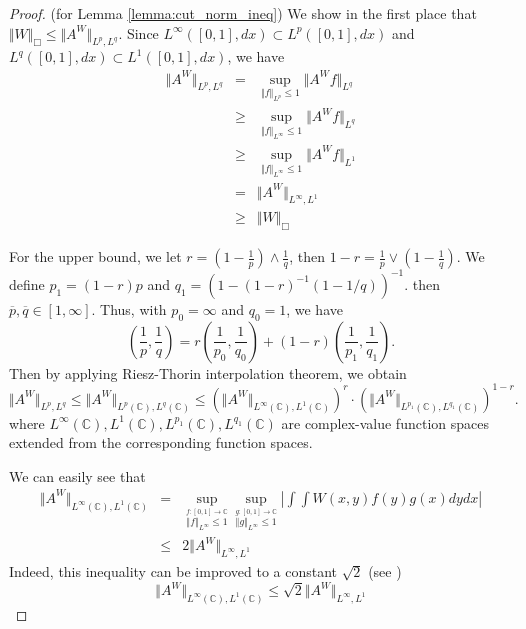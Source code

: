 \begin{proof}(for Lemma \ref{lemma:cut_norm_ineq})
We show in the first place that $\Vert W \Vert_{\Box} \leq \Vert A^W \Vert_{L^{p}, L^{q} }$. Since $L^{\infty}([0,1], dx) \subset L^p([0,1], dx)$ and $L^{q}([0,1], dx) \subset L^1([0,1],dx)$, we have
\begin{eqnarray*}
	\Vert A^W \Vert_{L^{p}, L^{q}} &=& \sup_{ \Vert f \Vert_{L^{p}} \leq 1 } \Vert A^W f \Vert_{L^{q} }\\
	&\geq & \sup_{ \Vert f \Vert_{L^\infty} \leq 1 } \Vert A^W f \Vert_{L^{q}} \\
	& \geq & \sup_{ \Vert f \Vert_{L^\infty} \leq 1 } \Vert A^W f \Vert_{L^1} \\
	&=& \Vert A^W \Vert_{L^{\infty}, L^1}\\
	&\geq& \Vert W \Vert_{\Box}
\end{eqnarray*}
	
For the upper bound, we let $r = (1-\frac{1}{p})\wedge \frac{1}{q}$, then $1-r = \frac{1}{p} \vee (1-\frac{1}{q})$. We define $p_1 =  (1-r)p$ and $q_1 = \left(1 - (1-r)^{-1} ( 1- 1/ q) \right)^{-1}$. then $\overline{p}, \overline{q} \in [1,\infty]$. Thus, with $p_0 = \infty$ and $q_0 = 1$, we have
$$
	\left( \frac{1}{p}, \frac{1}{q} \right) = r  \left(\frac{1}{p_0}, \frac{1}{q_0} \right) + (1-r) \left( \frac{1}{p_1}, \frac{1}{q_1} \right).
$$
Then by applying Riesz-Thorin interpolation theorem, we obtain
$$
	\Vert A^W \Vert_{L^{p}, L^{q} } \leq 	\Vert A^W \Vert_{L^{p}(\mathbb{C}), L^{q}(\mathbb{C}) } \leq \left( \Vert A^W \Vert_{L^{\infty}(\mathbb{C}), L^1(\mathbb{C})} \right)^r \cdot \left( \Vert A^W \Vert_{L^{p_1}(\mathbb{C}), L^{q_1}(\mathbb{C}) } \right)^{1-r}.
$$
where $L^{\infty}(\mathbb{C}), L^{1}(\mathbb{C}), L^{p_1}(\mathbb{C}), L^{q_1}(\mathbb{C})$ are complex-value function spaces extended from the corresponding function spaces.

We can easily see that
\begin{eqnarray*}
	\Vert A^W \Vert_{L^\infty(\mathbb{C}), L^1(\mathbb{C})} 
	&=& \sup_{\stackrel{ f: [0,1] \to \mathbb{C}}{\Vert f \Vert_{L^\infty} \leq 1} }  \sup_{\stackrel{ g: [0,1] \to \mathbb{C}}{\Vert g \Vert_{L^\infty} \leq 1} } \left\vert \int \int W(x,y) f(y) g(x) dy dx \right\vert \\
	&\leq&  2 \Vert A^W \Vert_{L^{\infty}, L^1} 
\end{eqnarray*}
Indeed, this inequality can be improved to a constant $\sqrt{2}$ (see \cite{krivine1979constantes})
$$
	\Vert A^W \Vert_{L^\infty(\mathbb{C}), L^1(\mathbb{C})} \leq  \sqrt{2} \Vert A^W \Vert_{L^{\infty}, L^1}
$$


\end{proof}

